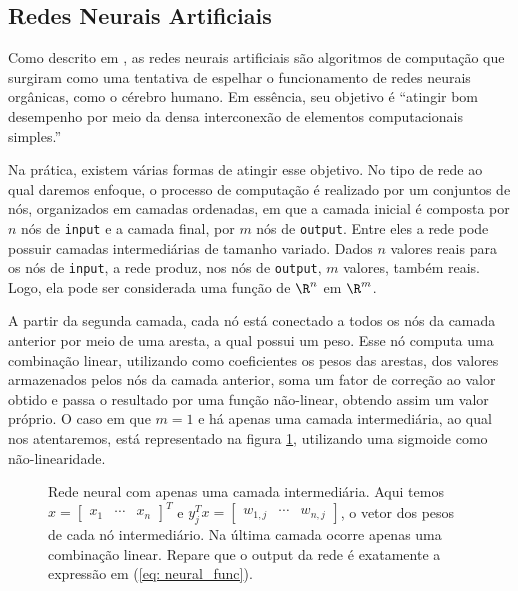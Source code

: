 \subsection{Redes Neurais Artificiais}

Como descrito em \cite{lipmann}, as redes neurais artificiais são algoritmos de computação que surgiram como uma tentativa de espelhar o funcionamento de redes neurais orgânicas, como o cérebro humano.
Em essência, seu objetivo é ``atingir bom desempenho por meio da densa interconexão de elementos computacionais simples.''

Na prática, existem várias formas de atingir esse objetivo.
No tipo de rede ao qual daremos enfoque, o processo de computação é realizado por um conjuntos de nós, organizados em camadas ordenadas, em que a camada inicial é composta por \( n \) nós de \verb|input| e a camada final, por \( m \) nós de \verb|output|.
Entre eles a rede pode possuir camadas intermediárias de tamanho variado.
Dados \( n \) valores reais para os nós de \verb|input|, a rede produz, nos nós de \verb|output|, \( m \) valores, também reais.
Logo, ela pode ser considerada uma função de \( \R^{ n } \) em \( \R^{ m } \).

A partir da segunda camada, cada nó está conectado a todos os nós da camada anterior por meio de uma aresta, a qual possui um peso.
Esse nó computa uma combinação linear, utilizando como coeficientes os pesos das arestas, dos valores armazenados pelos nós da camada anterior, soma um fator de correção ao valor obtido e passa o resultado por uma função não-linear, obtendo assim um valor próprio.
O caso em que \( m = 1 \) e há apenas uma camada intermediária, ao qual nos atentaremos, está representado na figura \ref{fig: neural_net}, utilizando uma sigmoide como não-linearidade.

\begin{figure}[htb]
    \begin{center}
        
    \end{center}
    \caption{Rede neural com apenas uma camada intermediária.
    Aqui temos \( x =
    \begin{bmatrix}
        x_{ 1 } & \cdots & x_{ n }
    \end{bmatrix}^{ T } \) e \( y_{ j }^{ T }x =
    \begin{bmatrix}
        w_{ 1,j } & \cdots & w_{ n,j }
    \end{bmatrix} \), o vetor dos pesos de cada nó intermediário.
    Na última camada ocorre apenas uma combinação linear.
    Repare que o output da rede é exatamente a expressão em (\ref{eq: neural_func}).}
    \label{fig: neural_net}
\end{figure}


